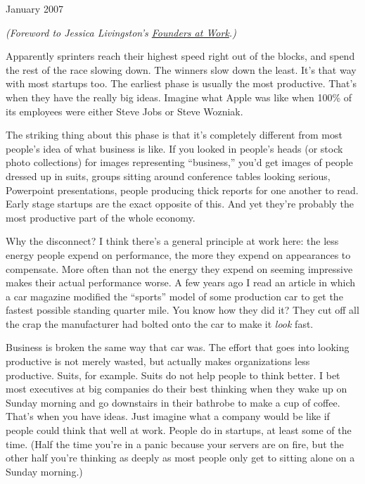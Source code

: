 January 2007

\emph{(Foreword to Jessica Livingston's
\href{http://www.amazon.com/gp/product/1590597141}{Founders at Work}.)}

Apparently sprinters reach their highest speed right out of the blocks,
and spend the rest of the race slowing down. The winners slow down the
least. It's that way with most startups too. The earliest phase is
usually the most productive. That's when they have the really big ideas.
Imagine what Apple was like when 100\% of its employees were either
Steve Jobs or Steve Wozniak.

The striking thing about this phase is that it's completely different
from most people's idea of what business is like. If you looked in
people's heads (or stock photo collections) for images representing
``business,'' you'd get images of people dressed up in suits, groups
sitting around conference tables looking serious, Powerpoint
presentations, people producing thick reports for one another to read.
Early stage startups are the exact opposite of this. And yet they're
probably the most productive part of the whole economy.

Why the disconnect? I think there's a general principle at work here:
the less energy people expend on performance, the more they expend on
appearances to compensate. More often than not the energy they expend on
seeming impressive makes their actual performance worse. A few years ago
I read an article in which a car magazine modified the ``sports'' model
of some production car to get the fastest possible standing quarter
mile. You know how they did it? They cut off all the crap the
manufacturer had bolted onto the car to make it \emph{look} fast.

Business is broken the same way that car was. The effort that goes into
looking productive is not merely wasted, but actually makes
organizations less productive. Suits, for example. Suits do not help
people to think better. I bet most executives at big companies do their
best thinking when they wake up on Sunday morning and go downstairs in
their bathrobe to make a cup of coffee. That's when you have ideas. Just
imagine what a company would be like if people could think that well at
work. People do in startups, at least some of the time. (Half the time
you're in a panic because your servers are on fire, but the other half
you're thinking as deeply as most people only get to sitting alone on a
Sunday morning.)

